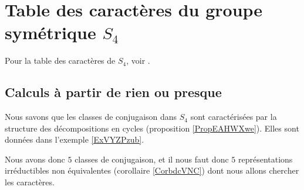 \section{Table des caractères du groupe symétrique \texorpdfstring{$ S_4$}{S4}}
\label{SecUMIgTmO}

Pour la table des caractères de \( S_4\), voir \cite{KXjFWKA}.

\subsection{Calculs à partir de rien ou presque}

Nous savons que les classes de conjugaison dans \( S_4\) sont caractérisées par la structure des décompositions en cycles (proposition \ref{PropEAHWXwe}). Elles sont données dans l'exemple \ref{ExVYZPzub}.

Nous avons donc \( 5\) classes de conjugaison, et il nous faut donc \( 5\) représentations irréductibles non équivalentes (corollaire \ref{CorbdcVNC}) dont nous allons chercher les caractères. 

